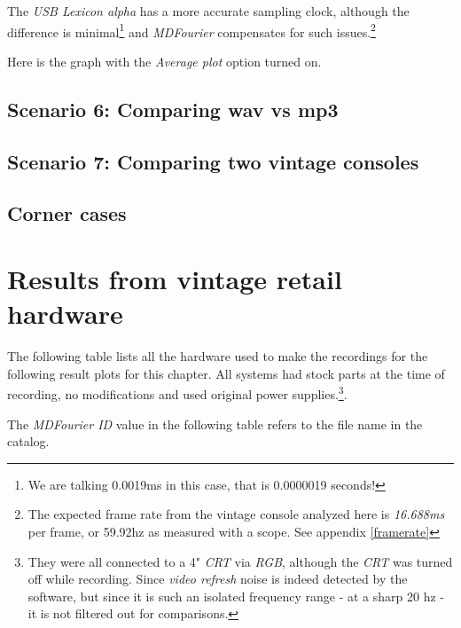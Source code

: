 \documentclass[10pt,a4paper]{report}
\begin{document}
The \textit{USB Lexicon alpha} has a more accurate sampling clock, although the difference is minimal\footnote{We are talking 0.0019ms in this case, that is 0.0000019 seconds!} and \textit{MDFourier} compensates for such issues.\footnote{The expected frame rate from the vintage console analyzed here is \textit{16.688ms} per frame, or 59.92hz as measured with a scope. See appendix \ref{framerate}}

Here is the graph with the \textit{Average plot} option turned on.

\section{Scenario 6: Comparing wav vs mp3}
\label{mp3}

\section{Scenario 7: Comparing two vintage consoles}

\section{Corner cases}
\label{cornercase}

\chapter{Results from vintage retail hardware}

The following table lists all the hardware used to make the recordings for the following result plots for this chapter. All systems had stock parts at the time of recording, no modifications and used original power supplies.\footnote{They were all connected to a 4" \textit{CRT} via \textit{RGB}, although the \textit{CRT} was turned off while recording. Since \textit{video refresh} noise is indeed detected by the software, but since it is such an isolated frequency range - at a sharp 20 hz - it is not filtered out for comparisons.}. 

The \textit{MDFourier ID} value in the following table refers to the file name in the catalog. 
\end{document}
